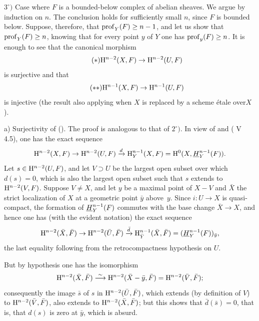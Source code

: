 $3^\circ)$ Case where $F$ is a bounded-below complex of abelian sheaves. We argue by induction on $n$. The conclusion holds for sufficiently small $n$, since $F$ is bounded below. Suppose, therefore, that $\operatorname{prof}_Y(F)\geq n-1$, and let us show that $\operatorname{prof}_Y(F)\geq n$, knowing that for every point $y$ of $Y$ one has $\operatorname{prof}_y(F)\geq n$. It is enough to see that the canonical morphism
\begin{equation*} \label{eq:XIV.1.8.*} \tag{$*$} {\mathrm H^{n-2}(X, F)\to \mathrm H^{n-2}(U, F)}
\end{equation*}
is surjective and that
\begin{equation*} \label{eq:XIV.1.8.**} \tag{$**$} {\mathrm H^{n-1}(X, F)\to \mathrm H^{n-1}(U, F)}
\end{equation*}
is injective (the result also applying when $X$ is replaced by a scheme étale over\pageoriginale $X$).

a) Surjectivity of (). The proof is analogous to that of $2^\circ)$. In view of  and ( V 4.5), one has the exact sequence
$$
\mathrm H^{n-2}(X, F)\to \mathrm H^{n-2}(U, F)\xrightarrow{d}\mathrm H^{n-1}_Y(X, F)=\mathrm H^0(X, {\mathop{\underline{H}}\nolimits}_Y^{n-1}(F)).
$$
Let $s\in \mathrm H^{n-2}(U, F)$, and let $V\supset U$ be the largest open subset over which $d(s)=0$, which is also the largest open subset such that $s$ extends to $\mathrm H^{n-2}(V, F)$. Suppose $V\neq X$, and let $y$ be a maximal point of $X-V$ and $\bar X$ the strict localization of $X$ at a geometric point $\bar y$ above~$y$. Since $i:U\to X$ is quasi-compact, the formation of ${\mathop{\underline{H}}\nolimits}_Y^{n-1}(F)$ commutes with the base change $\bar X\to X$, and hence one has (with the evident notation) the exact sequence
$$
\mathrm H^{n-2}(\bar X, \bar F)\to \mathrm H^{n-2}(\bar U, \bar F)\xrightarrow{\bar d}\mathrm H^{n-1}_{\bar Y}(\bar X, \bar F)=({\mathop{\underline{H}}\nolimits}_Y^{n-1}(F))_{\bar y},
$$
the last equality following from the retrocompactness hypothesis on $U$.

But by hypothesis one has the isomorphism
$$
\mathrm H^{n-2}(\bar X, \bar F)\overset{\sim}{\longrightarrow} \mathrm H^{n-2}(\bar X-\bar y, \bar F)=\mathrm H^{n-2}(\bar V, \bar F);
$$
consequently the image $\bar s$ of $s$ in $\mathrm H^{n-2}(\bar U, \bar F)$, which extends (by definition of $V$) to $\mathrm H^{n-2}(\bar V, \bar F)$, also extends to $\mathrm H^{n-2}(\bar X, \bar F)$; but this shows that $\bar d(\bar s)=0$, that is, that $d(s)$ is zero at $\bar y$, which is absurd.

